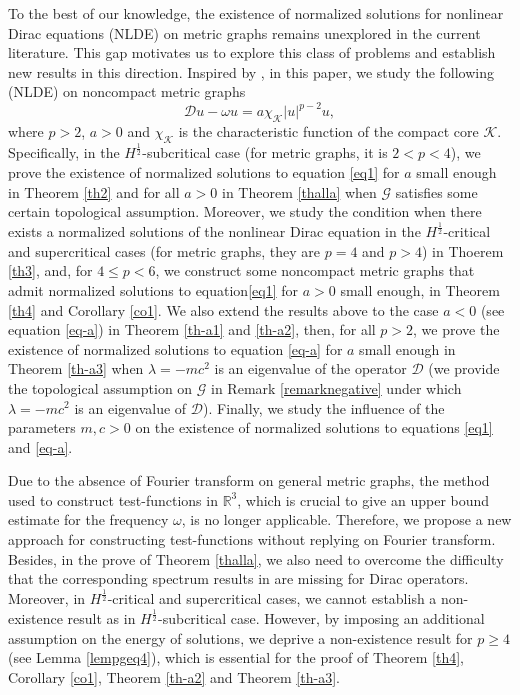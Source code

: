 \documentclass[11pt]{amsart}
\newcommand{\abs}[1]{\lvert#1\rvert}
\newcommand{\D}{\mathcal{D}}
\newcommand{\G}{\mathcal{G}}
\newcommand{\K}{\mathcal{K}}
\numberwithin{equation}{section}
\begin{document}
To the best of our knowledge, the existence of normalized solutions for nonlinear Dirac equations (NLDE) on metric graphs remains unexplored in the current literature. This gap motivates us to explore this class of problems and establish new results in this direction.  Inspired by \cite{Bo,Bu,Ding}, in this paper, we study the following (NLDE) on noncompact metric graphs
\begin{equation}
\label{eq1}
    \D u - \omega u= a\chi_\K\abs{u}^{p-2}u,
\end{equation}
where $p > 2$, $a > 0$ and $\chi_\K$ is the characteristic function of the compact core $\K$. Specifically, in the $H^\frac{1}{2}$-subcritical case (for metric graphs, it is $2<p<4$), we prove the existence of normalized solutions to equation \eqref{eq1} for $a$ small enough in Theorem \ref{th2} and for all $a>0$ in Theorem \ref{thalla} when $\G$ satisfies some certain topological assumption. Moreover, we study the condition when there exists a normalized solutions of the nonlinear Dirac equation in the $H^\frac{1}{2}$-critical and supercritical cases (for metric graphs, they are $p=4$ and $p > 4$) in Thoerem \ref{th3}, and, for $4\leq p <6$, we construct some noncompact metric graphs that admit normalized solutions to equation\eqref{eq1} for $a>0$ small enough, in Theorem \ref{th4} and Corollary \ref{co1}. We also extend the results above to the case $a<0$ (see equation \eqref{eq-a}) in Theorem \ref{th-a1} and \ref{th-a2}, then, for all $p>2$, we prove the existence of normalized solutions to equation \eqref{eq-a} for $a$ small enough in Theorem \ref{th-a3} when $\lambda = -mc^2$ is an eigenvalue of the operator $\D$ (we provide the topological assumption on $\G$ in Remark \ref{remarknegative} under which $\lambda = -mc^2$ is an eigenvalue of $\D$). Finally, we study the influence of the parameters $m, c > 0$ on the existence of normalized solutions to equations \eqref{eq1} and \eqref{eq-a}.

Due to the absence of Fourier transform on general metric graphs, the method used to construct test-functions in $\mathbb{R}^3$, which is crucial to give an upper bound estimate for the frequency $\omega$, is no longer applicable. Therefore, we propose a new approach for  constructing test-functions without replying on Fourier transform. Besides, in the prove of Theorem \ref{thalla}, we also need to overcome the difficulty that the corresponding spectrum results in \cite{Bu} are missing for Dirac operators. Moreover, in $H^\frac{1}{2}$-critical and supercritical cases, we cannot establish a non-existence result as in $H^\frac{1}{2}$-subcritical case. However, by imposing an additional assumption on the energy of solutions, we deprive a non-existence result for $p \geq 4$ (see Lemma \ref{lempgeq4}), which is essential for the proof of Theorem \ref{th4}, Corollary \ref{co1}, Theorem \ref{th-a2} and Theorem \ref{th-a3}.
\end{document}
